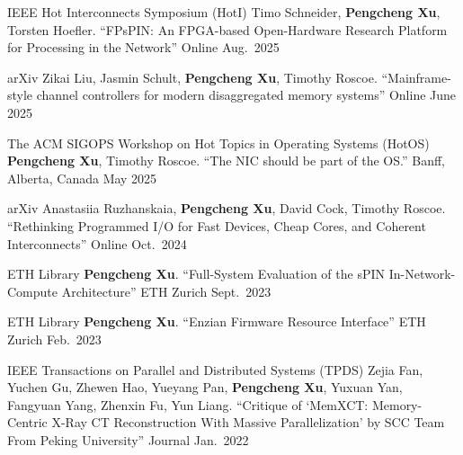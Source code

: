 


\begin{cventries}

  \cventry
    {IEEE Hot Interconnects Symposium (HotI)}
    {{\normalfont Timo Schneider, \textbf{Pengcheng Xu}, Torsten Hoefler. ``FPsPIN: An FPGA-based Open-Hardware Research Platform for Processing in the Network''}}
    {Online} %
    {Aug.\ 2025} %
    {}

  \cventry
    {arXiv}
    {{\normalfont Zikai Liu, Jasmin Schult, \textbf{Pengcheng Xu}, Timothy Roscoe. ``Mainframe-style channel controllers for modern disaggregated memory systems''}}
    {Online} %
    {June 2025} %
    {}

  \cventry
    {The ACM SIGOPS Workshop on Hot Topics in Operating Systems (HotOS)}
    {{\normalfont \textbf{Pengcheng Xu}, Timothy Roscoe. ``The NIC should be part of the OS.''}}
    {Banff, Alberta, Canada} %
    {May 2025} %
    {}

  \cventry
    {arXiv}
    {{\normalfont Anastasiia Ruzhanskaia, \textbf{Pengcheng Xu}, David Cock, Timothy Roscoe. ``Rethinking Programmed I/O for Fast Devices, Cheap Cores, and Coherent Interconnects''}}
    {Online} %
    {Oct.\ 2024} %
    {}

  \cventry
    {ETH Library}
    {{\normalfont \textbf{Pengcheng Xu}. ``Full-System Evaluation of the sPIN In-Network-Compute Architecture''}}
    {ETH Zurich} %
    {Sept.\ 2023} %
    {}

  \cventry
    {ETH Library}
    {{\normalfont \textbf{Pengcheng Xu}. ``Enzian Firmware Resource Interface''}}
    {ETH Zurich} %
    {Feb.\ 2023} %
    {}

  \cventry
    {IEEE Transactions on Parallel and Distributed Systems (TPDS)}
    {{\normalfont Zejia Fan, Yuchen Gu, Zhewen Hao, Yueyang Pan, \textbf{Pengcheng Xu}, Yuxuan Yan, Fangyuan Yang, Zhenxin Fu, Yun Liang. ``Critique of `MemXCT: Memory-Centric X-Ray CT Reconstruction With Massive Parallelization' by SCC Team From Peking University''}}
    {Journal} %
    {Jan.\ 2022} %
    {}


\end{cventries}

